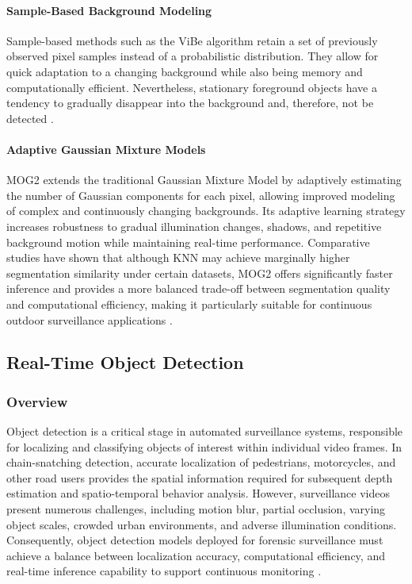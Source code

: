 \documentclass[conference]{IEEEtran}
\begin{document}
\paragraph{Sample-Based Background Modeling}

Sample-based methods such as the ViBe algorithm retain a set of previously observed pixel samples instead of a probabilistic distribution. They allow for quick adaptation to a changing background while also being memory and computationally efficient. Nevertheless, stationary foreground objects have a tendency to gradually disappear into the background and, therefore, not be detected \cite{vibe}.

\paragraph{Adaptive Gaussian Mixture Models}

MOG2 extends the traditional Gaussian Mixture Model by adaptively estimating the number of Gaussian components for each pixel, allowing improved modeling of complex and continuously changing backgrounds. Its adaptive learning strategy increases robustness to gradual illumination changes, shadows, and repetitive background motion while maintaining real-time performance. Comparative studies have shown that although KNN may achieve marginally higher segmentation similarity under certain datasets, MOG2 offers significantly faster inference and provides a more balanced trade-off between segmentation quality and computational efficiency, making it particularly suitable for continuous outdoor surveillance applications \cite{zivkovic2004mog2}.

\subsection{Real-Time Object Detection}

\subsubsection{Overview}

Object detection is a critical stage in automated surveillance systems, responsible for localizing and classifying objects of interest within individual video frames. In chain-snatching detection, accurate localization of pedestrians, motorcycles, and other road users provides the spatial information required for subsequent depth estimation and spatio-temporal behavior analysis. However, surveillance videos present numerous challenges, including motion blur, partial occlusion, varying object scales, crowded urban environments, and adverse illumination conditions. Consequently, object detection models deployed for forensic surveillance must achieve a balance between localization accuracy, computational efficiency, and real-time inference capability to support continuous monitoring \cite{malhotra2020objectcomparison}.
\end{document}
